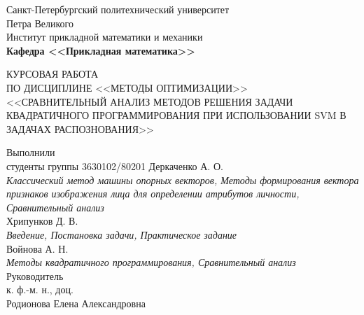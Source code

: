 \documentclass[main.tex]{subfiles}
\begin{document}
\begin{titlepage}
\begin{center}
	\begin{large}
		Санкт-Петербургский политехнический университет\\ Петра Великого\\		
		\vspace{\baselineskip}
		Институт прикладной математики и механики\\
		\textbf{Кафедра <<Прикладная математика>>}\\
	\end{large}
	\vfill
	\Large{{КУРСОВАЯ РАБОТА\\
	ПО ДИСЦИПЛИНЕ <<МЕТОДЫ ОПТИМИЗАЦИИ>>\\ <<СРАВНИТЕЛЬНЫЙ АНАЛИЗ МЕТОДОВ РЕШЕНИЯ ЗАДАЧИ КВАДРАТИЧНОГО ПРОГРАММИРОВАНИЯ ПРИ ИСПОЛЬЗОВАНИИ SVM В ЗАДАЧАХ РАСПОЗНОВАНИЯ>>}}
\end{center}
\vfill
\flushleft
Выполнили\\
студенты группы 3630102/80201
\flushright
Деркаченко А. О.\\
\textit{Классический метод машины опорных векторов, Методы формирования вектора признаков изображения лица для определении атрибутов личности, Сравнительный анализ}\\
Хрипунков Д. В.\\
\textit{Введение, Постановка задачи, Практическое задание}\\
Войнова А. Н.\\
\textit{Методы квадратичного программирования, Сравнительный анализ}\\
\flushleft
Руководитель\\
к. ф.-м. н., доц.\\
\flushright
Родионова Елена Александровна
\vfill
{}
\end{titlepage}
\end{document}

